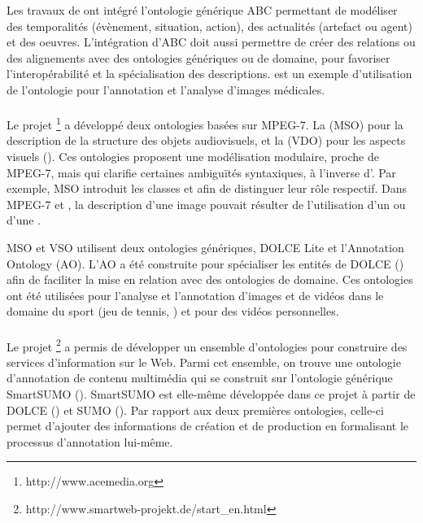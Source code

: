 Les travaux de \cite{Hunter2001} ont intégré l'ontologie générique ABC permettant de modéliser des temporalités (évènement, situation, action), des actualités (artefact ou agent) et des oeuvres.
L'intégration d'ABC doit aussi permettre de créer des relations ou des alignements avec des ontologies génériques ou de domaine, pour favoriser l'interopérabilité et la spécialisation des descriptions. 
\cite{Hunter2004} est un exemple d'utilisation de l'ontologie pour l'annotation et l'analyse d'images médicales. 


\paragraph{}
Le projet \footnote{http://www.acemedia.org} a développé deux ontologies basées sur MPEG-7. 
La  (MSO) pour la description de la structure des objets audiovisuels, et la  (VDO) pour les aspects visuels (\cite{Petridis2004, Martinez2002}).
Ces ontologies proposent une modélisation modulaire, proche de MPEG-7, mais qui clarifie certaines ambiguïtés syntaxiques, à l'inverse d'.
Par exemple, MSO introduit les classes  et  afin de distinguer leur rôle respectif. 
Dans MPEG-7 et , la description d'une image pouvait résulter de l'utilisation d'un  ou d'une .

MSO et VSO utilisent deux ontologies génériques, DOLCE Lite et l'Annotation Ontology (AO).
L'AO a été construite pour spécialiser les entités de DOLCE (\cite{Borgo2002}) afin de faciliter la mise en relation avec des ontologies de domaine.
Ces ontologies ont été utilisées pour l'analyse et l'annotation d'images et de vidéos dans le domaine du sport (jeu de tennis, \cite{Petridis2006}) et pour des vidéos personnelles.


\paragraph{}
Le projet \footnote{http://www.smartweb-projekt.de/start\_en.html} a permis de développer un ensemble d'ontologies pour construire des services d'in\-fo\-rmation sur le Web. 
Parmi cet ensemble, on trouve une ontologie d'annotation de contenu multimédia qui se construit sur l'ontologie générique SmartSUMO (\cite{Oberle2007, Vembu2006}).
SmartSUMO est elle-même développée dans ce projet à partir de DOLCE (\cite{Borgo2002}) et SUMO (\cite{Niles2001}). 
Par rapport aux deux premières ontologies, celle-ci permet d'ajouter des informations de création et de production en formalisant le processus d'annotation lui-même.


